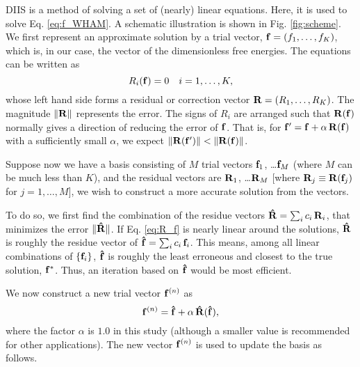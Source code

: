 \documentclass[reprint,superscriptaddress]{revtex4-1}
\begin{document}
DIIS is a method of solving a set of
(nearly) linear equations\cite{
pulay1980, *pulay1982, *hamilton1986,
kovalenko1999, howard2011}.
%
Here, it is used
to solve Eq. \eqref{eq:f_WHAM}.
%
A schematic illustration
is shown in Fig. \ref{fig:scheme}.
%
We first represent an approximate solution
by a trial vector,
$\mathbf{f} = (f_1, \dots, f_K)$,
which is, in our case, the vector of
the dimensionless free energies.
%
The equations can be written as
%
\begin{equation}
  R_i(\mathbf{f}) = 0  \quad i = 1, \ldots, K,
  \label{eq:R_f}
\end{equation}
%
whose left hand side forms
a residual or correction vector
$\mathbf{R} = (R_1, \dots, R_K)$.
%
The magnitude
$\| \mathbf{R} \|$
represents the error.
%
The signs of $R_i$ are arranged such that
$\mathbf{R}(\mathbf{f})$
normally gives a direction
of reducing the error of $\mathbf{f}$.
%
That is,
for $\mathbf{f}' = \mathbf{f} + \alpha \, \mathbf{R}(\mathbf{f})$
with a sufficiently small $\alpha$,
we expect
%
$\| \mathbf{R}(\mathbf{f}') \| < \| \mathbf{R}(\mathbf{f}) \|$.



Suppose now we have a basis consisting of $M$ trial vectors
$\mathbf{f}_1$, \dots $\mathbf{f}_M$
(where $M$ can be much less than $K$),
%
and the residual vectors are
$\mathbf{R}_1$, \dots $\mathbf{R}_M$
[where $\mathbf{R}_j \equiv \mathbf{R}(\mathbf{f}_j)$
for $j = 1, \dots, M$],
%
we wish to construct a more accurate solution
from the vectors.



To do so, we first find the combination of the residue vectors
$\mathbf{\hat R} = \sum_i c_i \, \mathbf{R}_i$,
that minimizes the error
$\| \mathbf{\hat R} \|$.
%
If Eq. \eqref{eq:R_f} is nearly linear
around the solutions,
%
$\mathbf{\hat R}$
is roughly the residue vector of
$\mathbf{\hat f} = \sum_i c_i \, \mathbf{f}_i$.
%
This means,
among all linear combinations of
$\{ \mathbf{f}_i \}$,
$\mathbf{\hat f}$
is roughly the least erroneous
and closest to the true solution,
$\mathbf{f}^*$.
%
Thus,
an iteration based on
$\mathbf{\hat f}$
would be most efficient.



We now construct a new trial vector $\mathbf{f}^{(n)}$ as
%
\begin{equation}
\mathbf{f}^{(n)}
=
\mathbf{\hat f}
+
\alpha \, \mathbf{\hat R}( \mathbf{\hat f} ),
\end{equation}
%
where the factor $\alpha$ is $1.0$ in this study
(although a smaller value is recommended
for other applications\cite{kovalenko1999, howard2011}).
%
The new vector $\mathbf{f}^{(n)}$
is used to update the basis as follows.
\end{document}
